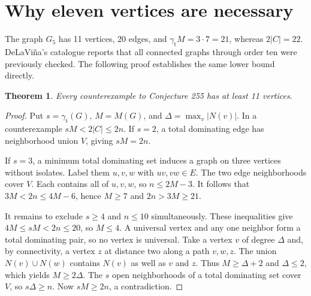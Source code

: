 \documentclass[10pt]{article}
\newtheorem{theorem}{Theorem}
\newcommand{\gtot}{\gamma_{\mathrm t}}
\begin{document}
\section{Why eleven vertices are necessary}
The graph \(G_5\) has 11 vertices, 20 edges, and \(\gtot M=3\cdot7=21\),
whereas \(2|C|=22\). DeLaVi\~na's catalogue reports that all connected
graphs through order ten were previously checked. The following proof
establishes the same lower bound directly.

\begin{theorem}
Every counterexample to Conjecture 255 has at least 11 vertices.
\end{theorem}
\begin{proof}
Put \(s=\gtot(G)\), \(M=M(G)\), and \(\Delta=\max_v |N(v)|\).
In a counterexample \(sM<2|C|\le2n\). If \(s=2\), a total dominating
edge has neighborhood union \(V\), giving \(sM=2n\).

If \(s=3\), a minimum total dominating set induces a graph on three
vertices without isolates. Label them \(u,v,w\) with \(uv,vw\in E\).
The two edge neighborhoods cover \(V\). Each contains all of \(u,v,w\),
so \(n\le 2M-3\). It follows that \(3M<2n\le4M-6\), hence \(M\ge7\)
and \(2n>3M\ge21\).

It remains to exclude \(s\ge4\) and \(n\le10\) simultaneously.
These inequalities give \(4M\le sM<2n\le20\), so \(M\le4\).
A universal vertex and any one neighbor form a total dominating pair,
so no vertex is universal. Take a vertex \(v\) of degree \(\Delta\) and,
by connectivity, a vertex \(z\) at distance two along a path \(v,w,z\).
The union \(N(v)\cup N(w)\) contains \(N(v)\) as well as \(v\) and \(z\).
Thus \(M\ge\Delta+2\) and \(\Delta\le2\), which yields \(M\ge2\Delta\).
The \(s\) open neighborhoods of a total dominating set cover \(V\), so
\(s\Delta\ge n\). Now \(sM\ge2n\), a contradiction.
\end{proof}
\end{document}
